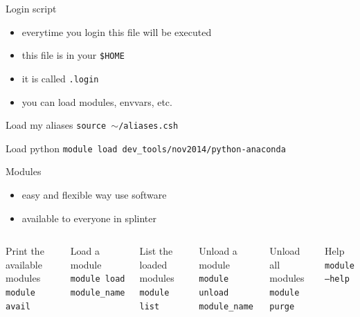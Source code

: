 \documentclass{beamer}
\begin{document}
\begin{frame}[fragile]{Login script}
	\begin{itemize}
		\item everytime you login this file will be executed
		\item this file is in your \texttt{\$HOME}
		\item it is called \texttt{.login}
		\item you can load modules, envvars, etc.
	\end{itemize}
	\begin{Examples}
		\begin{block}{Load my aliases}
		    \texttt{source $\sim$/aliases.csh}
                \end{block}
                \begin{block}{Load python}
                     \texttt{module load dev\_tools/nov2014/python-anaconda}
                \end{block}
	\end{Examples}
\end{frame}

\begin{frame}[fragile]{Modules}
	\begin{itemize}
		\item easy and flexible way use software
		\item available to everyone in splinter
	\end{itemize}
	
	\begin{Examples}
	    \begin{columns}
		\begin{block}{Print the available modules}
			\texttt{module avail}
		\end{block}
		\begin{block}{Load a module}
			\texttt{module load module\_name}
		\end{block}
		\begin{block}{List the loaded modules}
			\texttt{module list}
		\end{block}
	
	        \column{.5\textwidth}
		\begin{block}{Unload a module}
			\texttt{module unload module\_name}
		\end{block}
		\begin{block}{Unload all modules}
			\texttt{module purge}
		\end{block}		
		\begin{block}{Help}
			\texttt{module --help}
		\end{block}	
	    \end{columns}								
	\end{Examples}
\end{frame}
\end{document}
